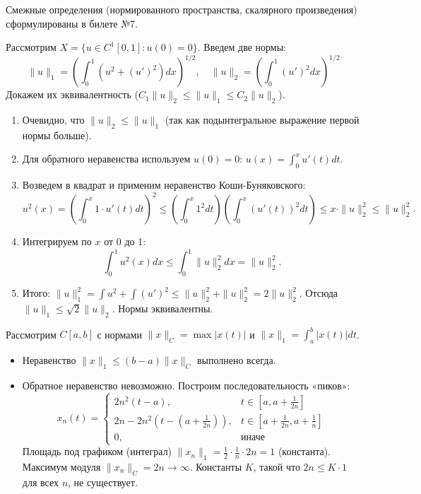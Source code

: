 \begin{remark}
	Смежные определения (нормированного пространства, скалярного произведения) сформулированы в билете №7.
\end{remark}

\begin{example}
	Рассмотрим $X = \{u \in C^1[0, 1] : u(0) = 0\}$. Введем две нормы:
	\[ \|u\|_1 = \left(\int_0^1 (u^2 + (u')^2) dx\right)^{1/2}, \quad \|u\|_2 = \left(\int_0^1 (u')^2 dx\right)^{1/2} \]
	Докажем их эквивалентность ($C_1 \|u\|_2 \leqslant \|u\|_1 \leqslant C_2 \|u\|_2$).
	\begin{enumerate}
		\item Очевидно, что $\|u\|_2 \leqslant \|u\|_1$ (так как подынтегральное выражение первой нормы больше).
		\item Для обратного неравенства используем $u(0)=0$: $u(x) = \int_0^x u'(t) dt$.
		\item Возведем в квадрат и применим неравенство Коши-Буняковского:
		\[ u^2(x) = \left(\int_0^x 1 \cdot u'(t)dt \right)^2 \leqslant \left(\int_0^x 1^2 dt\right) \left(\int_0^x (u'(t))^2 dt\right) \leqslant x \cdot \|u\|_2^2 \leqslant \|u\|_2^2. \]
		\item Интегрируем по $x$ от 0 до 1:
		\[ \int_0^1 u^2(x) dx \leqslant \int_0^1 \|u\|_2^2 dx = \|u\|_2^2. \]
		\item Итого: $\|u\|_1^2 = \int u^2 + \int (u')^2 \leqslant \|u\|_2^2 + \|u\|_2^2 = 2\|u\|_2^2$.
		Отсюда $\|u\|_1 \leqslant \sqrt{2}\|u\|_2$. Нормы эквивалентны.
	\end{enumerate}
\end{example}



\begin{example}
	Рассмотрим $C[a, b]$ с нормами $\|x\|_C = \max |x(t)|$ и $\|x\|_1 = \int_a^b |x(t)| dt$.
	\begin{itemize}
		\item Неравенство $\|x\|_1 \leqslant (b-a)\|x\|_C$ выполнено всегда.
		\item Обратное неравенство невозможно. Построим последовательность «пиков»:
		\[
		x_n(t) = \begin{cases} 
			2n^2(t-a), & t \in [a, a + \frac{1}{2n}] \\
			2n - 2n^2(t - (a+\frac{1}{2n})), & t \in [a+\frac{1}{2n}, a+\frac{1}{n}] \\
			0, & \text{иначе}
		\end{cases}
		\]
		Площадь под графиком (интеграл) $\|x_n\|_1 = \frac{1}{2} \cdot \frac{1}{n} \cdot 2n = 1$ (константа).
		Максимум модуля $\|x_n\|_C = 2n \to \infty$.
		Константы $K$, такой что $2n \leqslant K \cdot 1$ для всех $n$, не существует.
	\end{itemize}
\end{example}



